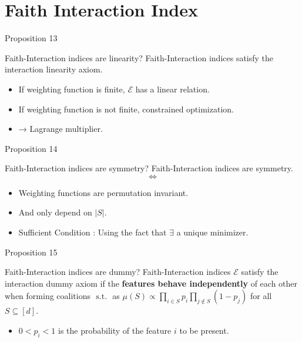 \documentclass[10pt]{beamer}
\newcommand{\ex}{\Expl}
\def\Expl{\mathcal{E}}
\begin{document}

\section[Faith Interaction Index]{Faith Interaction Index}
\begin{frame}{Proposition 13}
    \begin{myaxiombox}{Faith-Interaction indices are linearity?}
         Faith-Interaction indices satisfy the interaction linearity axiom.
    \end{myaxiombox}
    \vspace{1.5em}
    \begin{itemize}[label=\scalebox{0.5}{$\blacksquare$}]
        \item If weighting function is finite, $\ex$ has a linear relation.
        \item If weighting function is not finite, constrained optimization.    \item → Lagrange multiplier.
    \end{itemize}
\end{frame}
\begin{frame}{Proposition 14}
    \begin{myaxiombox}{Faith-Interaction indices are symmetry?}
        Faith-Interaction indices are symmetry.
        \[\iff\]
        \begin{itemize}
            \item Weighting functions are permutation invariant.
            \item And only depend on $|S|$.
        \end{itemize}
    \end{myaxiombox}
    \begin{itemize}[label=\scalebox{0.5}{$\blacksquare$}]
        \item Sufficient Condition : Using the fact that $\exists$ a unique minimizer.
    \end{itemize}
\end{frame}
\begin{frame}{Proposition 15}
    \begin{myaxiombox}{Faith-Interaction indices are dummy?}
        Faith-Interaction indices $\Expl$ satisfy the interaction dummy axiom if the \textbf{features behave independently} of each other when forming coalitions $\text{ s.t. }$ as $\mu(S) \propto \prod_{i \in S} p_i \prod_{j \not \in S} (1-p_j)$ for all $S \subseteq [d]$.
    \end{myaxiombox}
    \begin{itemize}[label=\scalebox{0.5}{$\blacksquare$}]
        \item $0 < p_i < 1$ is the probability of the feature $i$ to be present.
    \end{itemize}
\end{frame}
\end{document}
